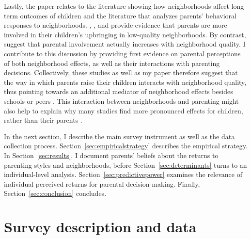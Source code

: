 \documentclass[12pt, a4paper, english]{article}
\begin{document}
Lastly, the paper relates to the literature showing how neighborhoods affect long-term outcomes of children \citep[see, e.g.,][for evidence that neighborhoods affect a variety of social and economic outcomes]{ChettyHendren2018Exposure,ChettyHendren2018County,Chettyetal2018OpportunityAtlas,Deutscher2019,ChynKatz2021} and the literature that analyzes parents' behavioral responses to neighborhoods. \citet{Klingetal2005}, \citet{PopElechesUrquiola2013}, and \citet{Han2019} provide evidence that parents are more involved in their children's upbringing in low-quality neighborhoods. By contrast, \citet{PatacchiniZenou2011} suggest that parental involvement actually increases with neighborhood quality. I contribute to this discussion by providing first evidence on parental perceptions of both neighborhood effects, as well as their interactions with parenting decisions. Collectively, these studies as well as my paper therefore suggest that the way in which parents raise their children interacts with neighborhood quality, thus pointing towards an additional mediator of neighborhood effects besides schools \citep[e.g.,][]{Laliberte2018} or peers \citep[e.g.,][]{Agostinelli2018}. This interaction between neighborhoods and parenting might also help to explain why many studies find more pronounced effects for children, rather than their parents \citep[e.g.,][]{Chettyetal2016MTO,Chyn2018,Deutscher2019,Nakamuraetal2021}. 

In the next section, I describe the main survey instrument as well as the data collection process. Section~\ref{sec:empiricalstrategy} describes the empirical strategy. In Section~\ref{sec:results}, I document parents' beliefs about the returns to parenting styles and neighborhoods, before Section~\ref{sec:determinants} turns to an individual-level analysis. Section~\ref{sec:predictivepower} examines the relevance of individual perceived returns for parental decision-making. Finally, Section~\ref{sec:conclusion} concludes. 

\section{Survey description and data}\label{sec:surveydescription_data}
\end{document}
